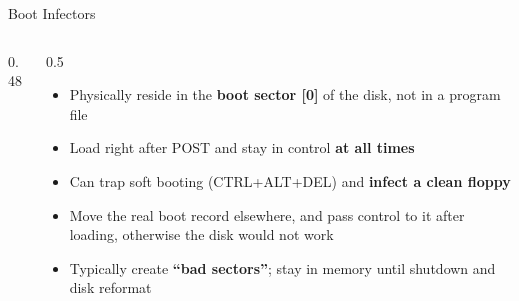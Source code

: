 \documentclass[aspectratio=169,11pt,xcolor={table}]{beamer}
\begin{document}
\begin{frame}{Boot Infectors}
  \begin{columns}[c]
    \begin{column}{0.48\textwidth}
      \centering
    \end{column}
    \begin{column}{0.5\textwidth}
      \begin{itemize}\small\setlength{\itemsep}{3pt}
        \item Physically reside in the \textbf{boot sector [0]} of the disk, not in a program file
        \item Load right after POST and stay in control \textbf{at all times}
        \item Can trap soft booting (CTRL+ALT+DEL) and \textbf{infect a clean floppy}
        \item Move the real boot record elsewhere, and pass control to it after loading, otherwise the disk would not work
        \item Typically create \textbf{``bad sectors''}; stay in memory until shutdown and disk reformat
      \end{itemize}
    \end{column}
  \end{columns}
\end{frame}
\end{document}
